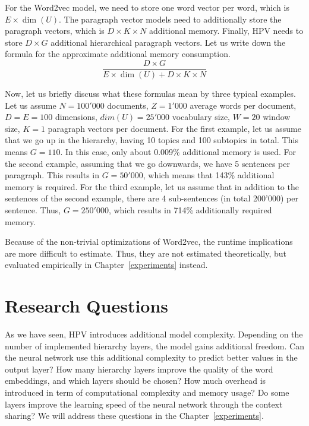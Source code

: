 For the Word2vec model, we need to store one word vector per word, which is $E \times \dim(U)$. The paragraph vector models need to additionally store the paragraph vectors, which is $D \times K \times N$ additional memory. Finally, HPV needs to store $D \times G$ additional hierarchical paragraph vectors. Let us write down the formula for the approximate additional memory consumption.
\begin{displaymath}
\frac{D \times G}{E \times \dim(U) +D \times K \times N}
\end{displaymath}

Now, let us briefly discuss what these formulas mean by three typical examples. Let us assume $N=100'000$ documents, $Z=1'000$ average words per document, $D=E=100$ dimensions, $dim(U)=25'000$ vocabulary size, $W=20$ window size, $K=1$ paragraph vectors per document. For the first example, let us assume that we go up in the hierarchy, having 10 topics and 100 subtopics in total. This means $G=110$. In this case, only about 0.009\% additional memory is used. For the second example, assuming that we go downwards, we have 5 sentences per paragraph. This results in $G=50'000$, which means that 143\% additional memory is required. For the third example, let us assume that in addition to the sentences of the second example, there are 4 sub-sentences (in total 200'000) per sentence. Thus, $G=250'000$, which results in 714\% additionally required memory.

Because of the non-trivial optimizations of Word2vec, the runtime implications are more difficult to estimate. Thus, they are not estimated theoretically, but evaluated empirically in Chapter~\ref{experiments} instead.

\section{Research Questions}

As we have seen, HPV introduces additional model complexity. Depending on the number of implemented hierarchy layers, the model gains additional freedom. Can the neural network use this additional complexity to predict better values in the output layer? How many hierarchy layers improve the quality of the word embeddings, and which layers should be chosen? How much overhead is introduced in term of computational complexity and memory usage? Do some layers improve the learning speed of the neural network through the context sharing? We will address these questions in the Chapter~\ref{experiments}.
